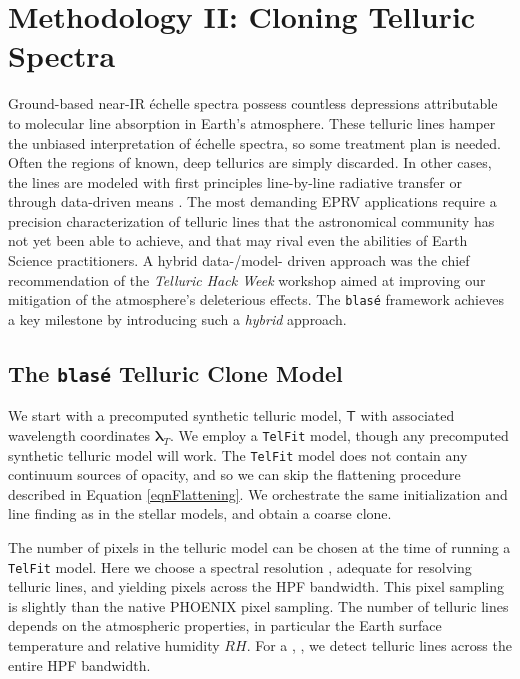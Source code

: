 \documentclass[modern]{aastex631}
\begin{document}
\section{Methodology II: Cloning Telluric Spectra}
Ground-based near-IR \'echelle spectra possess countless depressions attributable to molecular line absorption in Earth's atmosphere.  These telluric lines hamper the unbiased interpretation of \'echelle spectra, so some treatment plan is needed.  Often the regions of known, deep tellurics are simply discarded.  In other cases, the lines are modeled with first principles line-by-line radiative transfer \citep[\emph{e.g.} \texttt{TelFit,}][]{2014AJ....148...53G} or through data-driven means \citep[\emph{e.g.} \texttt{wobble,}][]{2019AJ....158..164B}.  The most demanding EPRV applications require a precision characterization of telluric lines that the astronomical community has not yet been able to achieve, and that may rival even the abilities of Earth Science practitioners.  A hybrid data-/model- driven approach was the chief recommendation of the \emph{Telluric Hack Week} workshop aimed at improving our mitigation of the atmosphere's deleterious effects.  The \texttt{blas\'e} framework achieves a key milestone by introducing such a \emph{hybrid} approach.

\subsection{The \texttt{blas\'e} Telluric Clone Model}
We start with a precomputed synthetic telluric model, $\mathsf{T}$ with associated wavelength coordinates $\bm{\lambda}_T$.  We employ a \texttt{TelFit} model, though any precomputed synthetic telluric model will work.  The \texttt{TelFit} model does not contain any continuum sources of opacity, and so we can skip the flattening procedure described in Equation \ref{eqnFlattening}.  We orchestrate the same initialization and line finding as in the stellar models, and obtain a coarse clone.

The number of pixels in the telluric model can be chosen at the time of running a \texttt{TelFit} model.  Here we choose a spectral resolution , adequate for resolving telluric lines, and yielding  pixels across the HPF bandwidth.  This pixel sampling is slightly  than the native PHOENIX pixel sampling.  The number of telluric lines depends on the atmospheric properties, in particular the Earth surface temperature and relative humidity $RH$.  For a , , we detect  telluric lines across the entire HPF bandwidth.
\end{document}
